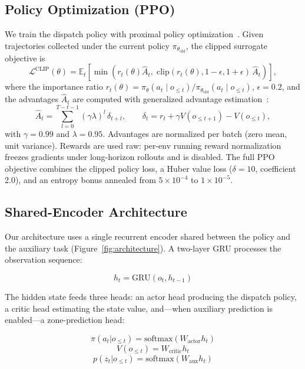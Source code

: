 \documentclass[conference]{IEEEtran}
\begin{document}
\subsection{Policy Optimization (PPO)}

We train the dispatch policy with proximal policy
optimization~\cite{schulman2017ppo}. Given trajectories collected
under the current policy $\pi_{\theta_{\mathrm{old}}}$, the clipped
surrogate objective is
\begin{equation}
\mathcal{L}^{\mathrm{CLIP}}(\theta) = \mathbb{E}_t\!\left[
\min\!\left( r_t(\theta)\hat{A}_t,\;
\mathrm{clip}(r_t(\theta), 1-\epsilon, 1+\epsilon)\,\hat{A}_t
\right) \right],
\end{equation}
where the importance ratio $r_t(\theta) =
\pi_\theta(a_t \mid o_{\le t}) / \pi_{\theta_{\mathrm{old}}}(a_t \mid
o_{\le t})$, $\epsilon = 0.2$, and the advantages $\hat{A}_t$ are
computed with generalized advantage estimation~\cite{schulman2016gae}:
\begin{equation}
\hat{A}_t = \sum_{l=0}^{T-t-1} (\gamma \lambda)^l\, \delta_{t+l},
\qquad
\delta_t = r_t + \gamma V(o_{\le t+1}) - V(o_{\le t}),
\end{equation}
with $\gamma = 0.99$ and $\lambda = 0.95$. Advantages are normalized
per batch (zero mean, unit variance). Rewards are used raw: per-env
running reward normalization freezes gradients under long-horizon
rollouts and is disabled. The full PPO objective
combines the clipped policy loss, a Huber value loss ($\delta = 10$,
coefficient 2.0), and an entropy bonus annealed from
$5 \times 10^{-4}$ to $1 \times 10^{-5}$.

\subsection{Shared-Encoder Architecture}

Our architecture uses a single recurrent encoder shared between the
policy and the auxiliary task (Figure~\ref{fig:architecture}).
A two-layer GRU processes the observation sequence:

\begin{equation}
h_t = \text{GRU}(o_t, h_{t-1})
\end{equation}

The hidden state feeds three heads: an actor head producing the
dispatch policy, a critic head estimating the state value, and---when
auxiliary prediction is enabled---a zone-prediction head:

\begin{equation}
\pi(a_t | o_{\le t}) = \text{softmax}(W_{\text{actor}} h_t)
\end{equation}
\begin{equation}
V(o_{\le t}) = W_{\text{critic}} h_t
\end{equation}
\begin{equation}
p(z_t | o_{\le t}) = \text{softmax}(W_{\text{aux}} h_t)
\end{equation}
\end{document}
